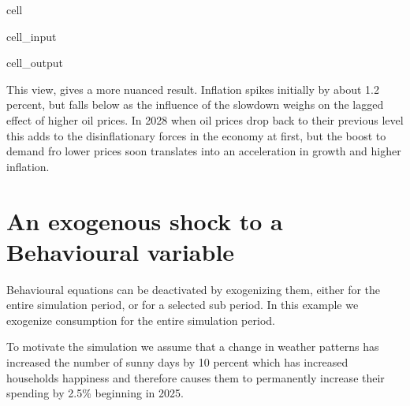 \documentclass[letterpaper,10pt,english]{jupyterBook}
\begin{document}
\begin{sphinxuseclass}{cell}\begin{sphinxVerbatimInput}

\begin{sphinxuseclass}{cell_input}
\begin{sphinxVerbatim}[commandchars=\\\{\}]
\PYG{p}{[}\PYG{p}{]}
\end{sphinxVerbatim}

\end{sphinxuseclass}\end{sphinxVerbatimInput}
\begin{sphinxVerbatimOutput}

\begin{sphinxuseclass}{cell_output}
\noindent{}

\end{sphinxuseclass}\end{sphinxVerbatimOutput}

\end{sphinxuseclass}
\sphinxAtStartPar
This view, gives a more nuanced result.  Inflation spikes initially by about 1.2 percent, but falls below as the influence of the slowdown weighs on the lagged effect of higher oil prices. In 2028 when oil prices drop back to their previous level this adds to the dis\sphinxhyphen{}inflationary forces in the economy at first, but the boost to demand fro lower prices soon translates into an acceleration in growth and higher inflation.


\section{An exogenous shock to a Behavioural variable}
\label{\detokenize{content/06_WBModels/LoadingWBModel:an-exogenous-shock-to-a-behavioural-variable}}
\sphinxAtStartPar
Behavioural equations can be de\sphinxhyphen{}activated by exogenizing them, either for the entire simulation period, or for a selected sub period.  In this example we exogenize consumption for the entire simulation period.

\sphinxAtStartPar
To motivate the simulation we assume that a change in weather patterns has increased the number of sunny days by 10 percent which has increased households happiness and therefore causes them to permanently increase their spending by 2.5\% beginning in 2025.
\end{document}
